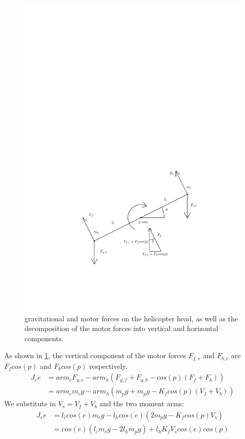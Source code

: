 %
\begin{figure}[H]
  \caption{gravitational and motor forces on the helicopter head, as
    well as the decomposition of the motor forces into vertical and
    horizontal components.}
  \label{fig:pitch_model}
  \includegraphics[width=1\textwidth]{images/pitch_model}
\end{figure}
%
As shown in \cref{fig:pitch_model}, the vertical component of the
motor forces $F_{f,v}$ and $F_{b,v}$ are $F_fcos(p)$ and $F_bcos(p)$
respectively.
%
\begin{align*}
  J_e\ddot{e} &= arm_cF_{g,c} - arm_h(F_{g,f}+F_{g,b} - cos(p)(F_f + F_b)) \\
              &= arm_cm_cg - arm_h(m_pg + m_pg - K_fcos(p)(V_f + V_b))
\end{align*}
%
We substitute in $V_s = V_f + V_b$ and the two moment arms:
%
\begin{align*}
  J_e\ddot{e} &= l_ccos(e)m_cg - l_hcos(e)(2m_pg - K_fcos(p)V_s) \\
              &= cos(e)(l_cm_cg - 2l_hm_pg) + l_hK_fV_scos(e)cos(p)
\end{align*}
